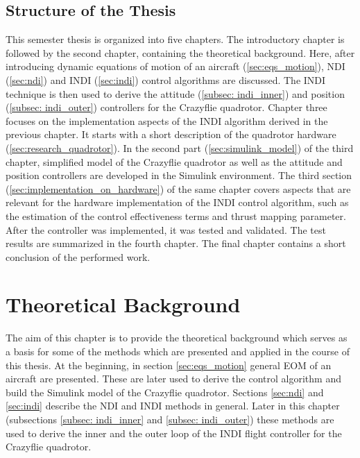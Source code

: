\documentclass[11pt, a4paper, twoside]{report}
\begin{document}
\section{Structure of the Thesis} \label{sec:structure_ofthe_thesis} 

This semester thesis is organized into five chapters. The introductory chapter is followed by the second chapter, containing the theoretical background. Here, after introducing dynamic equations of motion of an aircraft (\ref{sec:eqs_motion}), \acrshort{NDI} (\ref{sec:ndi}) and \acrshort{INDI} (\ref{sec:indi}) control algorithms are discussed. The \acrshort{INDI} technique is then used to derive the attitude (\ref{subsec: indi_inner}) and position (\ref{subsec: indi_outer}) controllers for the Crazyflie quadrotor. Chapter three focuses on the implementation aspects of the \acrshort{INDI} algorithm derived in the previous chapter. It starts with a short description of the quadrotor hardware (\ref{sec:research_quadrotor}). In the second part (\ref{sec:simulink_model}) of the third chapter, simplified model of the Crazyflie quadrotor as well as the attitude and position controllers are developed in the Simulink environment. The third section (\ref{sec:implementation_on_hardware}) of the same chapter covers aspects that are relevant for the hardware implementation of the \acrshort{INDI} control algorithm, such as the estimation of the control effectiveness terms and thrust mapping parameter. After the controller was implemented, it was tested and validated. The test results are summarized in the fourth chapter. The final chapter contains a short conclusion of the performed work.


\chapter{Theoretical Background} \label{cha:theoretical_background}

The aim of this chapter is to provide the theoretical background which serves as a basis for some of the methods which are presented and applied in the course of this thesis. At the beginning, in section \ref{sec:eqs_motion} general \acrfull{EOM} of an aircraft are presented. These are later used to derive the control algorithm and build the Simulink model of the Crazyflie quadrotor. Sections \ref{sec:ndi} and \ref{sec:indi} describe the \acrfull{NDI} and \acrfull{INDI} methods in general. Later in this chapter (subsections \ref{subsec: indi_inner} and \ref{subsec: indi_outer}) these methods are used to derive the inner and the outer loop of the \acrshort{INDI} flight controller for the Crazyflie quadrotor.
\end{document}
